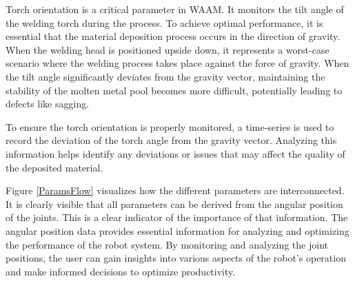 


Torch orientation is a critical parameter in WAAM. It monitors the tilt angle of the welding torch during the process. To achieve optimal performance, it is essential that the material deposition process occurs in the direction of gravity. When the welding head is positioned upside down, it represents a worst-case scenario where the welding process takes place against the force of gravity.
When the tilt angle significantly deviates from the gravity vector, maintaining the stability of the molten metal pool becomes more difficult, potentially leading to defects like sagging. 

To ensure the torch orientation is properly monitored, a time-series is used to record the deviation of the torch angle from the gravity vector. Analyzing this information helps identify any deviations or issues that may affect the quality of the deposited material. 






Figure \ref{ParamsFlow} visualizes how the different parameters are interconnected. It is clearly visible that all parameters can be derived from the angular position of the joints. This is a clear indicator of the importance of that information. The angular position data provides essential information for analyzing and optimizing the performance of the robot system. By monitoring and analyzing the joint positions, the user can gain insights into various aspects of the robot's operation and make informed decisions to optimize productivity.




